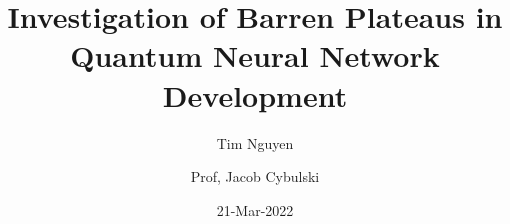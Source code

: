 

\title{Investigation of Barren Plateaus in Quantum Neural Network Development}
\date{21-Mar-2022}
\author{Tim Nguyen \and Prof, Jacob Cybulski}

% 




